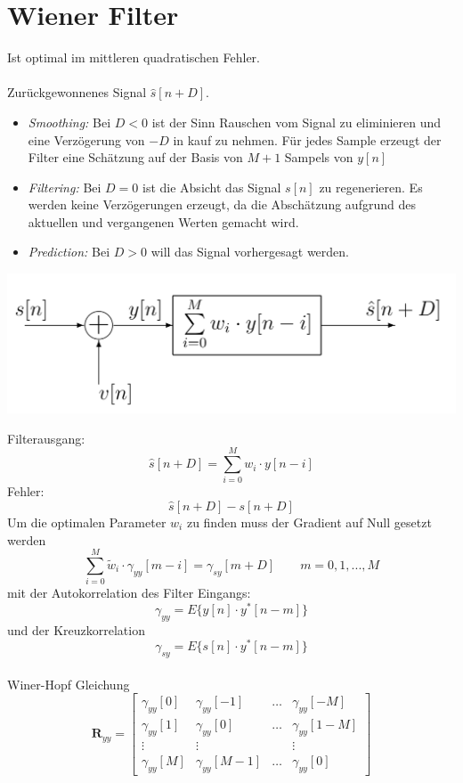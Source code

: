 \section{Wiener Filter}
Ist optimal im mittleren quadratischen Fehler.\\
\\
Zurückgewonnenes Signal $\hat{s}[n+D]$.
\begin{itemize}
	\item \textit{Smoothing:} Bei $D<0$ ist der Sinn Rauschen vom Signal zu
	eliminieren und eine Verzögerung von $-D$ in kauf zu nehmen. Für jedes Sample
	erzeugt der Filter eine Schätzung auf der Basis von $M+1$ Sampels von $y[n]$
	\item \textit{Filtering:} Bei $D=0$ ist die Absicht das Signal $s[n]$ zu regenerieren.
	Es werden keine Verzögerungen erzeugt, da die Abschätzung aufgrund des 
	aktuellen und vergangenen Werten gemacht wird.
	\item \textit{Prediction:} Bei $D>0$ will das Signal vorhergesagt werden.
\end{itemize} 
\begin{center}
	\includegraphics[scale=.7]{./images/wiener_filter}
\end{center}
Filterausgang:
\[ \hat{s}[n+D] = \sum_{i=0}^{M}w_i\cdot y[n-i] \]
Fehler:
\[ \hat{s}[n+D] - s[n+D] \]
Um die optimalen Parameter $w_i$ zu finden muss der Gradient auf Null gesetzt 
werden
\[ \sum_{i=0}^{M}\tilde{w}_i \cdot \gamma_{yy}[m-i] = \gamma_{sy}[m+D] \qquad
	m=0,1,...,M \]
mit der Autokorrelation des Filter Eingangs:
\[ \gamma_{yy} = E\{ y[n] \cdot y^*[n-m] \} \]
und der Kreuzkorrelation
\[ \gamma_{sy} = E \{ s[n] \cdot y^*[n-m] \} \]
~\\
Winer-Hopf Gleichung
\[ \textbf{R}_{yy} = \begin{bmatrix}
	\gamma_{yy}[0]	& \gamma_{yy}[-1]	& \ldots	& \gamma_{yy}[-M]\\
	\gamma_{yy}[1]	& \gamma_{yy}[0]	& \ldots	& \gamma_{yy}[1-M]\\
	\vdots			& \vdots			&			& \vdots\\
	\gamma_{yy}[M]	& \gamma_{yy}[M-1]	& \ldots	& \gamma_{yy}[0]
\end{bmatrix}\]
